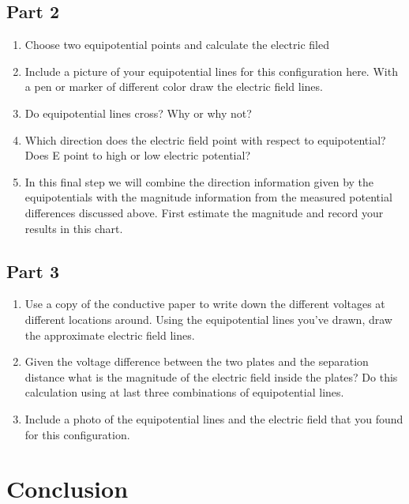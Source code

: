 \documentclass[titlepage]{article}
\begin{document}
	\subsection{Part 2}
		\begin{enumerate}
			\item Choose two equipotential points and calculate the electric filed
			\item Include a picture of your equipotential lines for this configuration here. With a pen or marker of different color draw the electric field lines.
			\item Do equipotential lines cross? Why or why not?
			\item Which direction does the electric field point with respect to equipotential? Does E point to high or low electric potential?
			\item In this final step we will combine the direction information given by the equipotentials with the magnitude information from the measured potential differences discussed above. First estimate the magnitude and record  your results in this chart.
		\end{enumerate}
		\subsection{Part 3}
		\begin{enumerate}
			\item Use a copy of the conductive paper to write down the different voltages at different locations around. Using the equipotential lines you've drawn, draw the approximate electric field lines.
			\item Given the voltage difference between the two plates and the separation distance what is the magnitude of the electric field inside the plates? Do this calculation using at last three combinations of equipotential lines.
			\item Include a photo of the equipotential lines and the electric field that you found for this configuration.
		\end{enumerate}
	\section{Conclusion}
	
	
\end{document}

